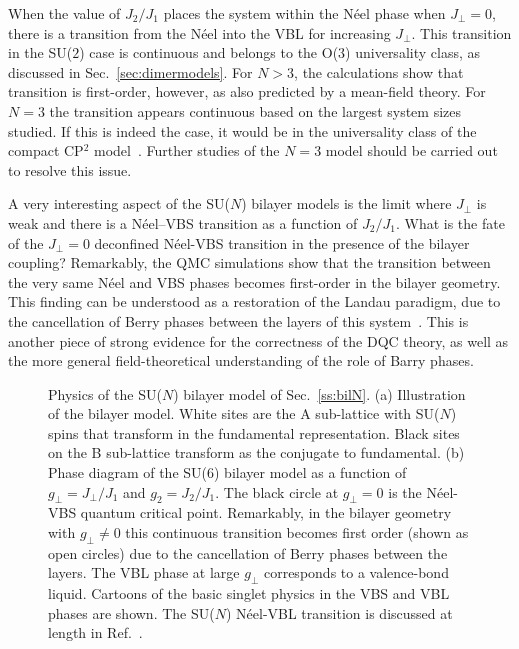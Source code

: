 \documentclass[range]{ar2e}
\begin{document}
When the value of $J_2/J_1$ places the system within the N\'eel phase when $J_\perp=0$, there is a transition  from
the N\'eel into the VBL for increasing $J_\perp$. This transition in the SU($2$) case is continuous and belongs to the O($3$) universality class,
as discussed in Sec.~\ref{sec:dimermodels}. For $N>3$, the calculations show that transition is first-order, however, as also predicted by a mean-field 
theory. For $N=3$ the transition appears continuous based on the largest system sizes studied. If this is indeed the case, it would be in the universality 
class of the compact CP$^2$ model~\cite{nahum2011:loops}. Further studies of the $N=3$ model should be carried out to resolve this issue.

A very interesting aspect of the SU($N$) bilayer models is the limit where $J_\perp$ is weak and there is a N\'eel--VBS transition as a function of $J_2/J_1$.
What is the fate of the $J_\perp=0$ deconfined N\'eel-VBS transition in the presence of the bilayer coupling? Remarkably, the QMC simulations show that the 
transition between the very same N\'eel and VBS phases becomes first-order in the bilayer geometry. This finding can be understood as a restoration of the 
Landau paradigm, due to the cancellation of Berry phases between the layers of this system~\cite{kaul2012:sun_bil}. This is another piece of strong evidence 
for the correctness of the DQC theory, as well as the more general field-theoretical understanding of the role of Barry phases.

\begin{figure}
\centerline{}
  \caption{ \label{fig:pd_bil}  Physics of the SU($N$) bilayer model  of Sec.~\ref{ss:bilN}.  (a) Illustration of the bilayer model. White sites are the A sub-lattice with SU($N$) spins that transform in the fundamental representation. Black sites on the B sub-lattice transform as the conjugate to fundamental. (b) Phase diagram of the
    SU($6$) bilayer model as a function of $g_\perp =J_\perp/J_1$ and $g_2=J_2/J_1$. The black circle at $g_\perp=0$ is the N\'eel-VBS quantum critical point. Remarkably, in the bilayer geometry with $g_\perp\neq 0$ this continuous transition becomes first order (shown as open circles) due to the cancellation of Berry phases between the layers. The VBL phase at large $g_\perp$ corresponds to a valence-bond liquid. Cartoons of the basic singlet physics in the VBS and VBL phases are shown. The SU($N$) N\'eel-VBL transition is discussed at length in Ref.~\cite{kaul2012:sun_bil}.}
\end{figure}
\end{document}
